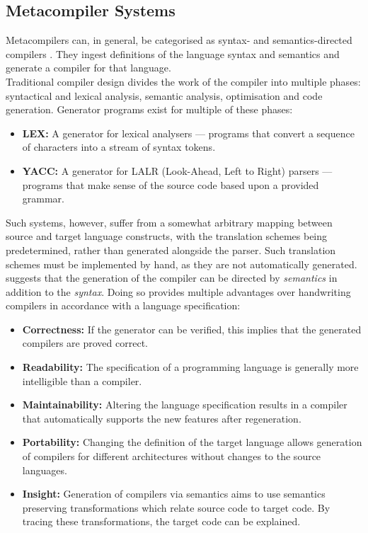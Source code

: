 \subsection{Metacompiler Systems} %
\label{sub:metacompiler_systems}
Metacompilers can, in general, be categorised as syntax- and semantics-directed compilers \citep{Mandell:1966:MDA:800267.810785,diehl1996semantics}.
They ingest definitions of the language syntax and semantics and generate a compiler for that language. \\

Traditional compiler design divides the work of the compiler into multiple phases: syntactical and lexical analysis, semantic analysis, optimisation and code generation. 
Generator programs exist for multiple of these phases:
\begin{itemize}
    \item \textbf{LEX:} A generator for lexical analysers --- programs that convert a sequence of characters into a stream of syntax tokens.
    \item \textbf{YACC:} A generator for LALR (Look-Ahead, Left to Right) parsers --- programs that make sense of the source code based upon a provided grammar.
\end{itemize}

Such systems, however, suffer from a somewhat arbitrary mapping between source and target language constructs, with the translation schemes being predetermined, rather than generated alongside the parser. 
Such translation schemes must be implemented by hand, as they are not automatically generated. \\

\citet{diehl1996semantics} suggests that the generation of the compiler can be directed by \textit{semantics} in addition to the \textit{syntax}.
Doing so provides multiple advantages over handwriting compilers in accordance with a language specification:
\begin{itemize}
    \item \textbf{Correctness:} If the generator can be verified, this implies that the generated compilers are proved correct.
    \item \textbf{Readability:} The specification of a programming language is generally more intelligible than a compiler.
    \item \textbf{Maintainability:} Altering the language specification results in a compiler that automatically supports the new features after regeneration.
    \item \textbf{Portability:} Changing the definition of the target language allows generation of compilers for different architectures without changes to the source languages.
    \item \textbf{Insight:} Generation of compilers via semantics aims to use semantics preserving transformations which relate source code to target code. 
    By tracing these transformations, the target code can be explained. 
\end{itemize}


